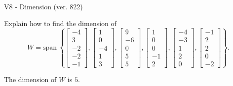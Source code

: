 \begin{exercise}
  \begin{exerciseTitle}V8 - Dimension (ver. 822)\end{exerciseTitle}
  \begin{exerciseStatement}
    Explain how to find the dimension of 
\[W=\mathrm{span}\ \left\{\left[\begin{array}{r}
-4 \\
3 \\
-2 \\
-2 \\
-1
\end{array}\right] , \left[\begin{array}{r}
1 \\
0 \\
-4 \\
1 \\
3
\end{array}\right] , \left[\begin{array}{r}
9 \\
-6 \\
0 \\
5 \\
5
\end{array}\right] , \left[\begin{array}{r}
1 \\
0 \\
0 \\
-1 \\
2
\end{array}\right] , \left[\begin{array}{r}
-4 \\
-3 \\
1 \\
2 \\
0
\end{array}\right] , \left[\begin{array}{r}
-1 \\
2 \\
2 \\
0 \\
-2
\end{array}\right]\right\}.\]



  \end{exerciseStatement}
  \begin{exerciseAnswer}
   The dimension of \(W\) is  \(5\).
  


  \end{exerciseAnswer}
\end{exercise}